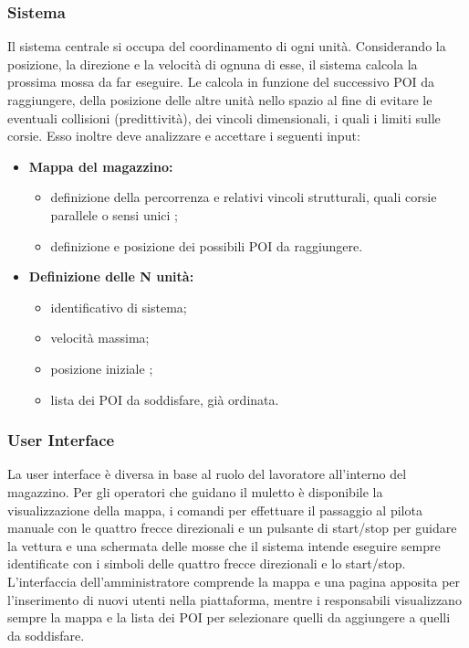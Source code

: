 \subsubsection{Sistema}
Il sistema centrale si occupa del coordinamento di ogni unità. Considerando la posizione, la direzione e la velocità di ognuna di esse, il sistema calcola la prossima mossa da far eseguire. Le calcola in funzione del successivo POI da raggiungere, della posizione delle altre unità nello spazio al fine di evitare le eventuali collisioni (predittività), dei vincoli dimensionali, i quali i limiti sulle corsie. Esso inoltre deve analizzare e accettare i seguenti input:
\begin{itemize}
	\item{\textbf{Mappa del magazzino:} }
			\begin{itemize}
			\item{definizione della percorrenza e relativi vincoli strutturali, quali corsie parallele o sensi unici ;}
			\item{definizione e posizione dei possibili POI da raggiungere.}
			\end{itemize}
	\item{\textbf{Definizione delle N unità:}}
			\begin{itemize}
			\item{identificativo di sistema;} 
			\item{velocità massima; } 
			\item{posizione iniziale ;} 
			\item{lista dei POI da soddisfare, già ordinata.}
			\end{itemize}
\end{itemize}

\subsubsection{User Interface} 
La user interface è diversa in base al ruolo del lavoratore all'interno del magazzino. Per gli operatori che guidano il muletto è disponibile la visualizzazione della mappa, i comandi per effettuare il passaggio al pilota manuale con le quattro frecce direzionali e un pulsante di start/stop per guidare la vettura e una schermata delle mosse che il sistema intende eseguire sempre identificate con i simboli delle quattro frecce direzionali e lo start/stop. 
L'interfaccia dell'amministratore comprende la mappa e una pagina apposita per l'inserimento di nuovi utenti nella piattaforma, mentre i responsabili visualizzano sempre la mappa e la lista dei POI per selezionare quelli da aggiungere a quelli da soddisfare.

